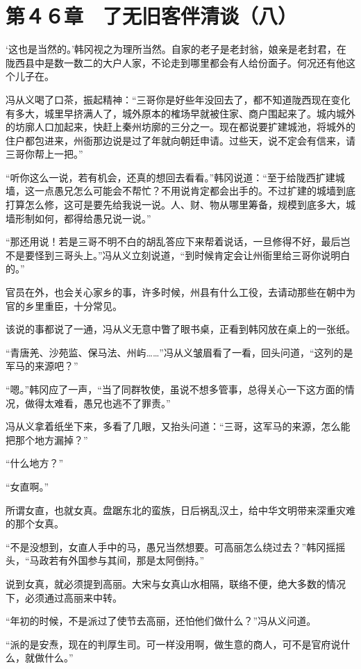 \section{第４６章　了无旧客伴清谈（八）}

‘这也是当然的。’韩冈视之为理所当然。自家的老子是老封翁，娘亲是老封君，在陇西县中是数一数二的大户人家，不论走到哪里都会有人给份面子。何况还有他这个儿子在。

冯从义喝了口茶，振起精神：“三哥你是好些年没回去了，都不知道陇西现在变化有多大，城里早挤满人了，城外原本的榷场早就被住家、商户围起来了。城内城外的坊廓人口加起来，快赶上秦州坊廓的三分之一。现在都说要扩建城池，将城外的住户都包进来，州衙那边说是过了年就向朝廷申请。过些天，说不定会有信来，请三哥你帮上一把。”

“听你这么一说，若有机会，还真的想回去看看。”韩冈说道：“至于给陇西扩建城墙，这一点愚兄怎么可能会不帮忙？不用说肯定都会出手的。不过扩建的城墙到底打算怎么修，这可是要先给我说一说。人、财、物从哪里筹备，规模到底多大，城墙形制如何，都得给愚兄说一说。”

“那还用说！若是三哥不明不白的胡乱答应下来帮着说话，一旦修得不好，最后岂不是要怪到三哥头上。”冯从义立刻说道，“到时候肯定会让州衙里给三哥你说明白的。”

官员在外，也会关心家乡的事，许多时候，州县有什么工役，去请动那些在朝中为官的乡里重臣，十分常见。

该说的事都说了一通，冯从义无意中瞥了眼书桌，正看到韩冈放在桌上的一张纸。

“青唐羌、沙苑监、保马法、州屿……”冯从义皱眉看了一看，回头问道，“这列的是军马的来源吧？”

“嗯。”韩冈应了一声，“当了同群牧使，虽说不想多管事，总得关心一下这方面的情况，做得太难看，愚兄也逃不了罪责。”

冯从义拿着纸坐下来，多看了几眼，又抬头问道：“三哥，这军马的来源，怎么能把那个地方漏掉？”

“什么地方？”

“女直啊。”

所谓女直，也就女真。盘踞东北的蛮族，日后祸乱汉土，给中华文明带来深重灾难的那个女真。

“不是没想到，女直人手中的马，愚兄当然想要。可高丽怎么绕过去？”韩冈摇摇头，“马政若有外国参与其间，那是太阿倒持。”

说到女真，就必须提到高丽。大宋与女真山水相隔，联络不便，绝大多数的情况下，必须通过高丽来中转。

“年初的时候，不是派过了使节去高丽，还怕他们做什么？”冯从义问道。

“派的是安焘，现在的判厚生司。可一样没用啊，做生意的商人，可不是官府说什么，就做什么。”

